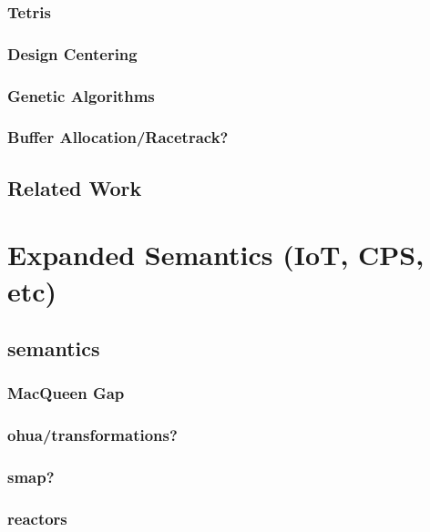 \documentclass{report}
\begin{document}
\section{Tetris}

\section{Design Centering}

\section{Genetic Algorithms}

\section{Buffer Allocation/Racetrack?}


\chapter{Related Work}



\part{Expanded Semantics (IoT, CPS, etc)}


\chapter{semantics}

\section{MacQueen Gap}

\section{ohua/transformations?}

\section{smap?}

\section{reactors}

\end{document}
